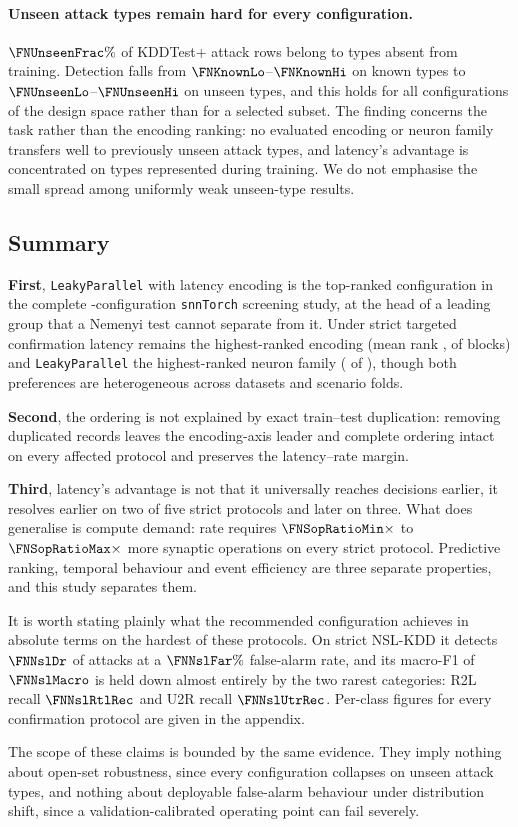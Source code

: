 \paragraph{Unseen attack types remain hard for every configuration.}
$\FNUnseenFrac\%$ of KDDTest+ attack rows belong to types absent from training.
Detection falls from $\FNKnownLo$--$\FNKnownHi$ on known types to
$\FNUnseenLo$--$\FNUnseenHi$ on unseen types, and this holds for all
\FNUnseenConfigs{} configurations of the design space rather than for a
selected subset. The finding concerns the task rather than the encoding ranking:
no evaluated encoding or neuron family transfers well to previously unseen
attack types, and latency's advantage is concentrated on types represented
during training. We do not emphasise the small spread among uniformly weak
unseen-type results.

\subsection{Summary}

\textbf{First}, \texttt{LeakyParallel} with latency encoding is the top-ranked
configuration in the complete \FNScrVariants{}-configuration \texttt{snnTorch}
screening study, at the head of a leading group that a Nemenyi test cannot
separate from it. Under strict targeted confirmation latency remains the
highest-ranked encoding (mean rank \FNEncRank, \FNEncWins{} of \FNEncBlocks{}
blocks) and \texttt{LeakyParallel} the highest-ranked neuron family
(\FNNeuRank{} of \FNNeuLevels), though both preferences are heterogeneous across
datasets and scenario folds.

\textbf{Second}, the ordering is not explained by exact train--test duplication:
removing duplicated records leaves the encoding-axis leader and complete
ordering intact on every affected protocol and preserves the latency--rate
margin.

\textbf{Third}, latency's advantage is not that it universally reaches decisions
earlier, it resolves earlier on two of five strict protocols and later on
three. What does generalise is compute demand: rate requires
$\FNSopRatioMin\times$ to $\FNSopRatioMax\times$ more synaptic operations on
every strict protocol. Predictive ranking, temporal behaviour and event
efficiency are three separate properties, and this study separates them.

It is worth stating plainly what the recommended configuration achieves in
absolute terms on the hardest of these protocols. On strict NSL-KDD it detects
$\FNNslDr$ of attacks at a $\FNNslFar\%$ false-alarm rate, and its macro-F1 of
$\FNNslMacro$ is held down almost entirely by the two rarest categories: R2L
recall $\FNNslRtlRec$ and U2R recall $\FNNslUtrRec$. Per-class figures for every
confirmation protocol are given in the appendix.

The scope of these claims is bounded by the same evidence. They imply nothing
about open-set robustness, since every configuration collapses on unseen attack
types, and nothing about deployable false-alarm behaviour under distribution
shift, since a validation-calibrated operating point can fail severely.
